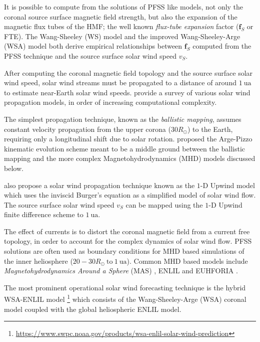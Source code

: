 It is possible to compute from the solutions of PFSS like models, not only the coronal source 
surface magnetic field strength, but also the expansion of the magnetic flux tubes of the HMF; 
the well known \emph{flux-tube expansion} factor ($\mathbf{f}_S$ or FTE). The Wang-Sheeley (WS) 
model \citep{WSAModel} and the improved Wang-Sheeley-Arge (WSA) model 
\citep{arge2000improvement,arge2004stream} both derive empirical relationships between 
$\mathbf{f}_S$ computed from the PFSS technique and the source surface solar wind speed $v_S$.  

After computing the coronal magnetic field topology and the source surface solar wind speed, 
solar wind streams must be propagated to a distance of around $\SI{1}{\astronomicalunit}$ to 
estimate near-Earth solar wind speeds. \citet{Riley2011} provide a survey of various solar wind 
propagation models, in order of increasing computational complexity. 

The simplest propagation technique, known as the \emph{ballistic mapping}, assumes constant 
velocity propagation from the upper corona ($30R_{\odot}$) to the Earth, requiring only a 
longitudinal shift due to solar rotation. \citet{arge2000improvement} proposed the Arge-Pizzo 
kinematic evolution scheme meant to be a middle ground between the ballistic mapping and the more 
complex Magnetohydrodynamics (MHD) models discussed below.

\citet{Riley2011} also propose a solar wind propagation technique known as the 
$1\textrm{-}\text{D}$ Upwind model which uses the inviscid Burger's equation as a simplified model 
of solar wind flow. The source surface solar wind speed $v_S$ can be mapped using the 
$1\textrm{-}\text{D}$ Upwind finite difference scheme to $\SI{1}{\astronomicalunit}$.

The effect of currents is to distort the coronal magnetic field from a current free topology, 
in order to account for the complex dynamics of solar wind flow. PFSS solutions are often used as 
boundary conditions for MHD based simulations of the inner heliosphere 
($20-30 R_{\odot} \ \mathrm{to} \ \SI{1}{\astronomicalunit}$). Common MHD based models include 
\emph{Magnetohydrodynamics Around a Sphere} (MAS) \citep{linker1999magnetohydrodynamic}, ENLIL 
\citep{ODSTRCIL1996,ODSTRCIL1999a,ODSTRCIL1999b,ODSTRCIL2003,ODSTRCIL2004} and EUHFORIA 
\citep{pomoell2018euhforia}. 

The most prominent operational solar wind forecasting technique is the hybrid WSA-ENLIL model 
\footnote{\url{https://www.swpc.noaa.gov/products/wsa-enlil-solar-wind-prediction}} which consists 
of the Wang-Sheeley-Arge (WSA) coronal model coupled with the global heliospheric ENLIL model. 

